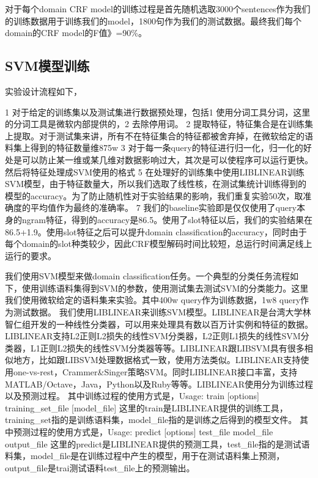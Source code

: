 \documentclass[master]{njuthesis}
\begin{document}
    对于每个domain CRF model的训练过程是首先随机选取3000个sentences作为我们的训练数据用于训练我们的model，1800句作为我们的测试数据。最终我们每个domain的CRF model的F值》=90\%。

\subsection{SVM模型训练}
    
实验设计流程如下，

1 对于给定的训练集以及测试集进行数据预处理，包括1 使用分词工具分词，这里的分词工具是微软内部提供的，2 去除停用词。
2 提取特征，特征集合是在训练集上提取。对于测试集来讲，所有不在特征集合的特征都被舍弃掉，在微软给定的语料集上得到的特征数量维875w
3 对于每一条query的特征进行归一化，归一化的好处是可以防止某一维或某几维对数据影响过大，其次是可以使程序可以运行更快。然后将特征处理成SVM使用的格式
5 在处理好的训练集中使用LIBLINEAR训练SVM模型，由于特征数量大，所以我们选取了线性核，在测试集统计训练得到的模型的accuracy。为了防止随机性对于实验结果的影响，我们重复实验50次，取准确度的平均值作为最终的准确率。
7 我们的baseline实验即是仅仅使用了query本身的ngram特征，得到的accuracy是86.5。使用了slot特征以后，我们的实验结果在86.5+1.9。使用slot特征之后可以提升domain classification的accuracy，同时由于每个domain的slot种类较少，因此CRF模型解码时间比较短，总运行时间满足线上运行的要求。

    我们使用SVM模型来做domain classification任务。一个典型的分类任务流程如下，使用训练语料集得到SVM的参数，使用测试集去测试SVM的分类能力。这里我们使用微软给定的语料集来实验。其中400w query作为训练数据，1w8 query作为测试数据。
   我们使用LIBLINEAR来训练SVM模型。LIBLINEAR是台湾大学林智仁组开发的一种线性分类器，可以用来处理具有数以百万计实例和特征的数据。LIBLINEAR支持L2正则L2损失的线性SVM分类器，L2正则L1损失的线性SVM分类器，L1正则L2损失的线性SVM分类器等等。LIBLINEAR跟LIBSVM具有很多相似地方，比如跟LIBSVM处理数据格式一致，使用方法类似。LIBLINEAR支持使用one-vs-rest，Crammer\&Singer策略SVM。同时LIBLINEAR接口丰富，支持MATLAB/Octave，Java，Python以及Ruby等等。LIBLINEAR使用分为训练过程以及预测过程。
    其中训练过程的使用方式是，Usage: train [options] training\_set\_file [model\_file]
   这里的train是LIBLINEAR提供的训练工具，training\_set指的是训练语料集，model\_file指的是训练之后得到的模型文件。
    其中预测过程的使用方式是，Usage: predict [options] test\_file model\_file output\_file
   这里的predict是LIBLINEAR提供的预测工具，test\_file指的是测试语料集，model\_file是在训练过程中产生的模型，用于在测试语料集上预测，output\_file是trai测试语料test\_file上的预测输出。
\end{document}
